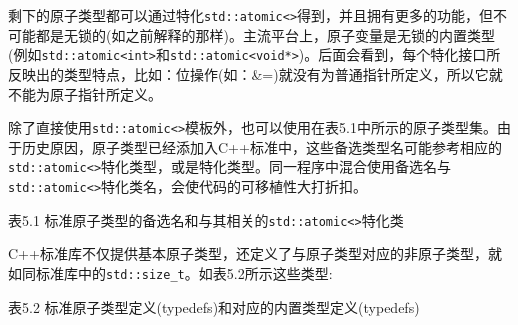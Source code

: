 剩下的原子类型都可以通过特化\texttt{std::atomic<>}得到，并且拥有更多的功能，但不可能都是无锁的(如之前解释的那样)。主流平台上，原子变量是无锁的内置类型(例如\texttt{std::atomic<int>}和\texttt{std::atomic<void*>})。后面会看到，每个特化接口所反映出的类型特点，比如：位操作(如：\&=)就没有为普通指针所定义，所以它就不能为原子指针所定义。

除了直接使用\texttt{std::atomic<>}模板外，也可以使用在表5.1中所示的原子类型集。由于历史原因，原子类型已经添加入C++标准中，这些备选类型名可能参考相应的\texttt{std::atomic<>}特化类型，或是特化类型。同一程序中混合使用备选名与\texttt{std::atomic<>}特化类名，会使代码的可移植性大打折扣。

表5.1 标准原子类型的备选名和与其相关的\texttt{std::atomic<>}特化类


C++标准库不仅提供基本原子类型，还定义了与原子类型对应的非原子类型，就如同标准库中的\texttt{std::size\_t}。如表5.2所示这些类型:

表5.2 标准原子类型定义(typedefs)和对应的内置类型定义(typedefs)


